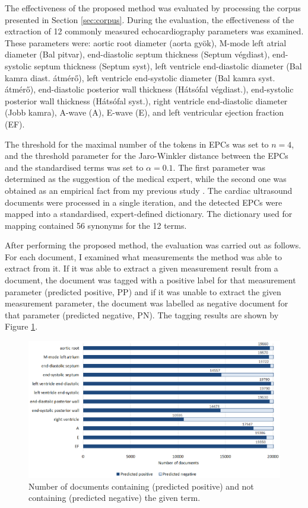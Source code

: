 The effectiveness of the proposed method was evaluated by processing the corpus presented in Section \ref{sec:corpus}. During the evaluation, the effectiveness of the extraction of 12 commonly measured echocardiography parameters was examined. These parameters were: aortic root diameter (aorta gyök), M-mode left atrial diameter (Bal pitvar), end-diastolic septum thickness (Septum végdiast), end-systolic septum thickness (Septum syst), left ventricle end-diastolic diameter (Bal kamra diast. átmérő), left ventricle end-systolic diameter (Bal kamra syst. átmérő), end-diastolic posterior wall thickness (Hátsófal végdiast.), end-systolic posterior wall thickness (Hátsófal syst.), right ventricle end-diastolic diameter (Jobb kamra), A-wave (A), E-wave (E), and left ventricular ejection fraction (EF). 

The threshold for the maximal number of the tokens in EPCs was set to $n=4$, and the threshold parameter for the Jaro-Winkler distance between the EPCs and the standardised terms was set to $\alpha=0.1$. The first parameter was determined as the suggestion of the medical expert, while the second one was obtained as an empirical fact from my previous study \cite{vathy2020efficiency}. The cardiac ultrasound documents were processed in a single iteration, and the detected EPCs were mapped into a standardised, expert-defined dictionary. The dictionary used for mapping contained 56 synonyms for the 12 terms. 

After performing the proposed method, the evaluation was carried out as follows. For each document, I examined what measurements the method was able to extract from it. If it was able to extract a given measurement result from a document, the document was tagged with a positive label for that measurement parameter (predicted positive, PP) and if it was unable to extract the given measurement parameter, the document was labelled as negative document for that parameter (predicted negative, PN). The tagging results are shown by Figure \ref{fig:ppv_and_npv_values}.

\begin{figure}[h]
	\centering
        \captionsetup{justification=centering}
	\includegraphics[width=\textwidth]{assets/figures/text_mining/extraction/ppv_npv.eps}
	\caption{Number of documents containing (predicted positive) and not containing (predicted negative) the given term. %
 }
	\label{fig:ppv_and_npv_values} 
\end{figure}


